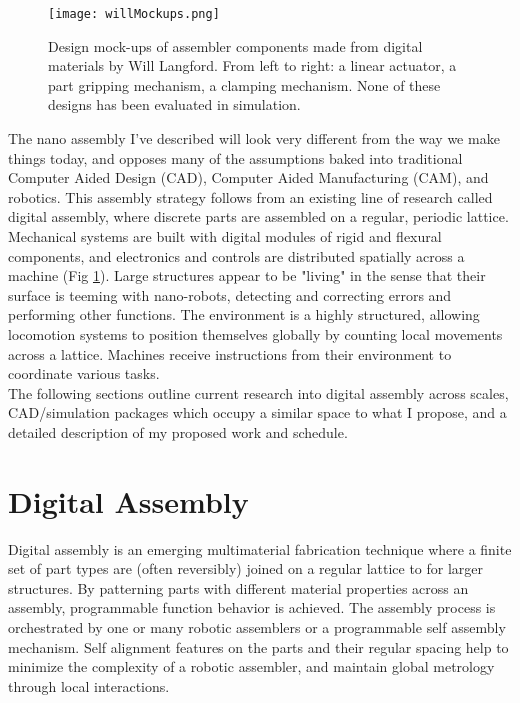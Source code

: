 {\begin{figure}
  \texttt{[image: willMockups.png]}
  \caption{Design mock-ups of assembler components made from digital materials by Will Langford.  From left to right: a linear actuator, a part gripping mechanism, a clamping mechanism.  None of these designs has been evaluated in simulation.}
  \label{fig:willMockups}
\end{figure}
The nano assembly I've described will look very different from the way we make things today, and opposes many of the assumptions baked into traditional Computer Aided Design (CAD),  Computer Aided Manufacturing (CAM), and robotics.  This assembly strategy follows from an existing line of research called digital assembly, where discrete parts are assembled on a regular, periodic lattice.  Mechanical systems are built with digital modules of rigid and flexural components, and electronics and controls are distributed spatially across a machine (Fig \ref{fig:willMockups}).  Large structures appear to be "living" in the sense that their surface is teeming with nano-robots, detecting and correcting errors and performing other functions.  The environment is a highly structured, allowing locomotion systems to position themselves globally by counting local movements across a lattice.  Machines receive instructions from their environment to coordinate various tasks.
\\

The following sections outline current research into digital assembly across scales, CAD/simulation packages which occupy a similar space to what I propose, and a detailed description of my proposed work and schedule.


\section{Digital Assembly}

Digital assembly is an emerging multimaterial fabrication technique where a finite set of part types are (often reversibly) joined on a regular lattice to for larger structures.  By patterning parts with different material properties across an assembly, programmable function behavior is achieved.  The assembly process is orchestrated by one or many robotic assemblers or a programmable self assembly mechanism.  Self alignment features on the parts and their regular spacing help to minimize the complexity of a robotic assembler, and maintain global metrology through local interactions.

}
